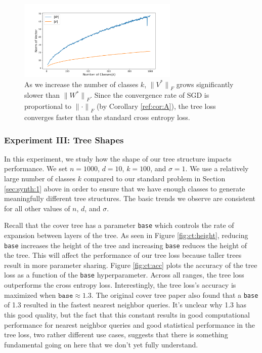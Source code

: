 \documentclass[twoside]{article}
\renewcommand{\star}[1]{{#1}^{*}}
\newcommand{\lF}[1]{{\lVert {#1} \rVert}_F}
\begin{document}
\begin{figure}
\includegraphics[width=\columnwidth,height=1.5in]{fig/images/class_v_norm.png}
\caption{As we increase the number of classes $k$,
    $\lF{\star V}$ grows significantly slower than $\lF{\star W}$.
    Since the convergence rate of SGD is proportional to $\lF{\cdot}$ (by Corollary \ref{ref:cor:A}),
    the tree loss converges faster than the standard cross entropy loss. 
    }
\label{fig:synth:norm}
\end{figure}


\subsubsection{Experiment III: Tree Shapes}

In this experiment, we study how the shape of our tree structure impacts performance.
We set $n=1000$, $d=10$, $k=100$, and $\sigma=1$.
We use a relatively large number of classes $k$ compared to our standard problem in Section \ref{sec:synth:1} above in order to ensure that we have enough classes to generate meaningfully different tree structures.
The basic trends we observe are consistent for all other values of $n$, $d$, and $\sigma$.

Recall that the cover tree has a parameter \texttt{base} which controls the rate of expansion between layers of the tree.
As seen in Figure \ref{fig:ct:height}, reducing \texttt{base} increases the height of the tree and increasing \texttt{base} reduces the height of the tree.
This will affect the performance of our tree loss because taller trees result in more parameter sharing.
Figure \ref{fig:ct:acc} plots the accuracy of the tree loss as a function of the \texttt{base} hyperparameter.
Across all ranges, the tree loss outperforms the cross entropy loss.
Interestingly, the tree loss's accuracy is maximized when $\texttt{base}\approx1.3$.
The original cover tree paper \citep{beygelzimer2006cover} also found that a \texttt{base} of 1.3 resulted in the fastest nearest neighbor queries.
It's unclear why 1.3 has this good quality,
but the fact that this constant results in good computational performance for nearest neighbor queries and good statistical performance in the tree loss, two rather different use cases, suggests that there is something fundamental going on here that we don't yet fully understand.
\end{document}
